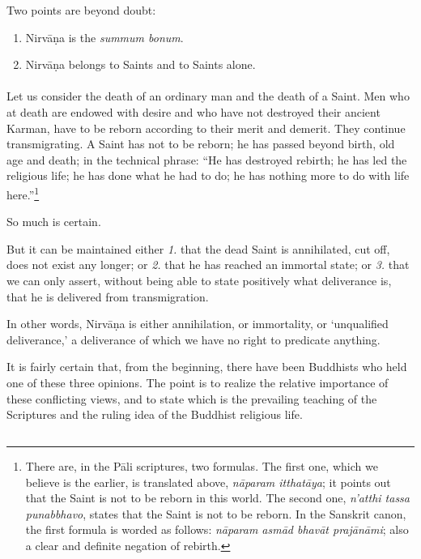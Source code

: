 \documentclass[a4paper, 11pt, oneside, english]{article}
\begin{document}
Two points are beyond doubt:
\begin{enumerate}
    \item Nirvāṇa is the \emph{summum bonum}.

    \item Nirvāṇa belongs to Saints and to Saints alone.
\end{enumerate}
\paragraph{}
Let us consider the death of an ordinary man and the death of a Saint. Men who at death are endowed with desire and who have not destroyed their ancient Karman, have to be reborn according to their merit and demerit. They continue transmigrating. A Saint has not to be reborn; he has passed beyond birth, old age and death; in the technical phrase: ``He has destroyed rebirth; he has led the religious life; he has done what he had to do; he has nothing more to do with life here.''\footnote{There are, in the Pāli scriptures, two formulas. The first one, which we believe is the earlier, is translated above, \emph{nāparam itthatāya}; it points out that the Saint is not to be reborn in this world. The second one, \emph{n'atthi tassa punabbhavo}, states that the Saint is not to be reborn. In the Sanskrit canon, the first formula is worded as follows: \emph{nāparam asmād bhavāt prajānāmi}; also a clear and definite negation of rebirth.}

So much is certain.

But it can be maintained either \emph{1.} that the dead Saint is annihilated, cut off, does not exist any longer; or \emph{2.} that he has reached an immortal state; or \emph{3.} that we can only assert, without being able to state positively what deliverance is, that he is delivered from transmigration.

In other words, Nirvāṇa is either annihilation, or immortality, or `unqualified deliverance,' a deliverance of which we have no right to predicate anything.

It is fairly certain that, from the beginning, there have been Buddhists who held one of these three opinions. The point is to realize the relative importance of these conflicting views, and to state which is the prevailing teaching of the Scriptures and the ruling idea of the Buddhist religious life.

\subsection{}
\end{document}
